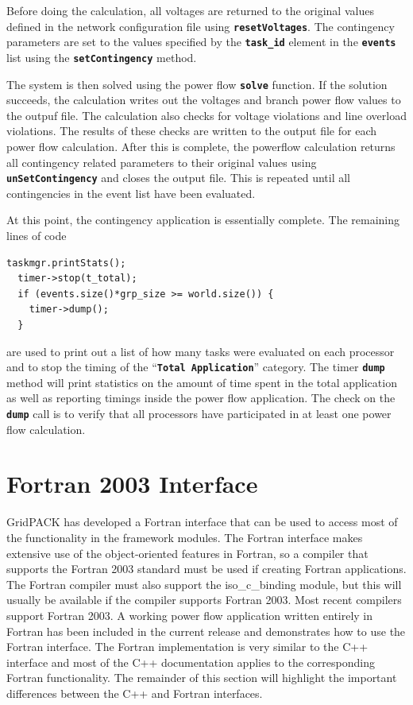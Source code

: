 \documentclass[12pt]{report} %
\begin{document}
Before doing the calculation, all voltages are returned to the original values defined in the network configuration file using \texttt{\textbf{resetVoltages}}. The contingency parameters are set to the values specified by the \texttt{\textbf{task\_id}} element in the \texttt{\textbf{events}} list using the \texttt{\textbf{setContingency}} method.

The system is then solved using the power flow \texttt{\textbf{solve}} function. If the solution succeeds, the calculation writes out the voltages and branch power flow values to the outpuf file. The calculation also checks for voltage violations and line overload violations. The results of these checks are written to the output file for each power flow calculation. After this is complete, the powerflow calculation returns all contingency related parameters to their original values using \texttt{\textbf{unSetContingency}} and closes the output file. This is repeated until all contingencies in the event list have been evaluated.

At this point, the contingency application is essentially complete. The remaining lines of code

{
\color{red}
\begin{Verbatim}[fontseries=b]
  taskmgr.printStats();
  timer->stop(t_total);
  if (events.size()*grp_size >= world.size()) {
    timer->dump();
  }
\end{Verbatim}
}

are used to print out a list of how many tasks were evaluated on each processor and to stop the timing of the ``\texttt{\textbf{Total Application}}'' category. The timer \texttt{\textbf{dump}} method will print statistics on the amount of time spent in the total application as well as reporting timings inside the power flow application. The check on the \texttt{\textbf{dump}} call is to verify that all processors have participated in at least one power flow calculation.

\section{Fortran 2003 Interface}

GridPACK has developed a Fortran interface that can be used to access most of the functionality in the framework modules. The Fortran interface makes extensive use of the object-oriented features in Fortran, so a compiler that supports the Fortran 2003 standard must be used if creating Fortran applications. The Fortran compiler must also support the iso\_c\_binding module, but this will usually be available if the compiler supports Fortran 2003. Most recent compilers support Fortran 2003. A working power flow application written entirely in Fortran has been included in the current release and demonstrates how to use the Fortran interface. The Fortran implementation is very similar to the C++ interface and most of the C++ documentation applies to the corresponding Fortran functionality. The remainder of this section will highlight the important differences between the C++ and Fortran interfaces.
\end{document}
